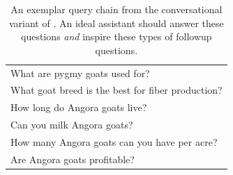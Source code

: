 \begin{table}[t]
\begin{center}
\begin{tabular}{l}
            What are pygmy goats used for?                                                    \\
            What goat breed is the best for fiber production?                                 \\
            How long do Angora goats live?                                                    \\
            Can you milk Angora goats?                                                        \\
            How many Angora goats can you have per acre?                                      \\
            Are Angora goats profitable?                                                      \\
            \bottomrule
        \end{tabular}
    \end{center}
    \caption{
        An exemplar query chain from the conversational variant of .
        An ideal assistant should answer these questions \emph{and} inspire these types of followup questions.
    }
    \label{tab:marco}
\end{table}
